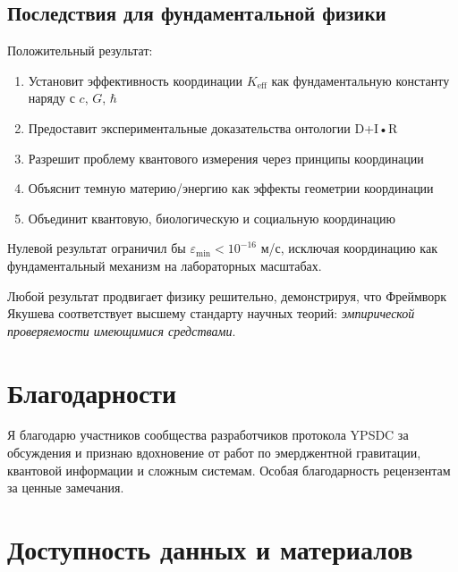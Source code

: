 \documentclass[11pt,a4paper]{article}
\begin{document}
	\subsection{Последствия для фундаментальной физики}
	
	Положительный результат:
	\begin{enumerate}
		\item Установит эффективность координации $K_{\mathrm{eff}}$ как фундаментальную константу наряду с $c$, $G$, $\hbar$
		\item Предоставит экспериментальные доказательства онтологии D+I•R
		\item Разрешит проблему квантового измерения через принципы координации
		\item Объяснит темную материю/энергию как эффекты геометрии координации
		\item Объединит квантовую, биологическую и социальную координацию
	\end{enumerate}
	
	Нулевой результат ограничил бы $\varepsilon_{\min} < 10^{-16}$ м/с, исключая координацию как фундаментальный механизм на лабораторных масштабах.
	
	Любой результат продвигает физику решительно, демонстрируя, что Фреймворк Якушева соответствует высшему стандарту научных теорий: \emph{эмпирической проверяемости имеющимися средствами}.
	
	\section*{Благодарности}
	Я благодарю участников сообщества разработчиков протокола YPSDC за обсуждения и признаю вдохновение от работ по эмерджентной гравитации, квантовой информации и сложным системам. Особая благодарность рецензентам за ценные замечания.
	\section*{Доступность данных и материалов}
	
\end{document}
